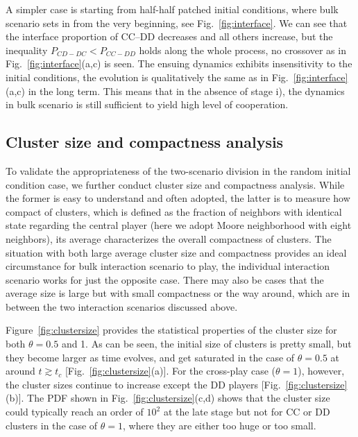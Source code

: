 \documentclass[showpacs,superscriptaddress,reprint,nofootinbib,amsmath,amssymb,aps,pre]{revtex4-1}
\begin{document}
A simpler case is starting from half-half patched initial conditions, where bulk scenario sets in from the very beginning, see Fig.~\ref{fig:interface}. We can see that the interface proportion of CC--DD decreases and all others increase, but the inequality $P_{CD-DC}<P_{CC-DD}$ holds along the whole process, no crossover as in Fig.~\ref{fig:interface}(a,c) is seen. The ensuing dynamics exhibits insensitivity to the initial conditions, the evolution is qualitatively the same as in Fig.~\ref{fig:interface}(a,c) in the long term. This means that in the absence of stage i), the dynamics in bulk scenario is still sufficient to yield high level of cooperation. 

\subsection{Cluster size and compactness analysis}\label{subsec:cluster}
To validate the appropriateness of the two-scenario division in the random initial condition case, we further conduct cluster size and compactness analysis. 
While the former is easy to understand and often adopted, the latter is to measure how compact of clusters, which is defined as the fraction of neighbors with identical state regarding the central player (here we adopt Moore neighborhood with eight neighbors), its average characterizes the overall compactness of clusters. The situation with both large average cluster size and compactness provides an ideal circumstance for bulk interaction scenario to play, the individual interaction scenario works for just the opposite case. There may also be cases that the average size is large but with small compactness or the way around, which are in between the two interaction scenarios discussed above.

Figure~\ref{fig:clustersize} provides the statistical properties of the cluster size for both $\theta=0.5$ and 1. As can be seen, the initial size of clusters is pretty small, but they become larger as time evolves, and get saturated in the case of $\theta=0.5$ at around $t\gtrsim t_c$ [Fig.~\ref{fig:clustersize}(a)]. For the cross-play case ($\theta=1$), however, the cluster sizes continue to increase except the DD players [Fig.~\ref{fig:clustersize}(b)]. The PDF shown in Fig.~\ref{fig:clustersize}(c,d) shows that the cluster size could typically reach an order of $10^2$ at the late stage but not for CC or DD clusters in the case of $\theta=1$, where they are either too huge or too small.
\end{document}
